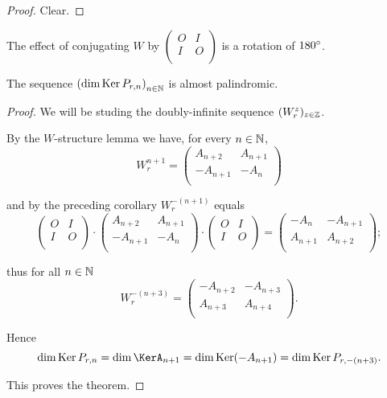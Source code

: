 \begin{proof}
  Clear.
\end{proof}

\begin{remark}
  The effect of conjugating $W$ by
  $\left(\begin{smallmatrix} O & I \\ I & O \\\end{smallmatrix}\right)$
  is a rotation of $180^{\circ}$.
\end{remark}

\begin{theorem}
  The sequence $\left(\dim\operatorname{Ker} P_{r,n}\right)_{n\in\mathbb{N}}$
  is almost palindromic.
\end{theorem}

\begin{proof}
  We will be studing the doubly-infinite sequence
  $(W_{r}^{z})_{z\in\mathbb{Z}}$.

  By the $W$-structure lemma we have, for every $n\in\mathbb{N}$,
  \[
  W_{r}^{n+1}
  =
  \left(
  \begin{array}{cc}
     A_{n+2} &  A_{n+1} \\
    -A_{n+1} & -A_{n}   \\
  \end{array}
  \right)
  \]

  and by the preceding corollary $W_{r}^{-(n+1)}$ equals
  \[
  \left(
  \begin{array}{cc}
    O & I \\
    I & O \\
  \end{array}
  \right)
  \cdot
  \left(
  \begin{array}{cc}
     A_{n+2} &  A_{n+1} \\
    -A_{n+1} & -A_{n}   \\
  \end{array}
  \right)
  \cdot
  \left(
  \begin{array}{cc}
    O & I \\
    I & O \\
  \end{array}
  \right)
  =
  \left(
  \begin{array}{cc}
    -A_{n}  & -A_{n+1} \\
     A_{n+1} & A_{n+2} \\
  \end{array}
  \right);
  \]

  thus for all $n\in\mathbb{N}$
  \[
  W_{r}^{-(n+3)}
  =
  \left(
  \begin{array}{cc}
    -A_{n+2}  & -A_{n+3} \\
     A_{n+3} & A_{n+4} \\
  \end{array}
  \right).
  \]

  Hence 
  \[
  \dim\Ker P_{r,n} =
  \dim\KerA_{n+1} =
  \dim\Ker(-A_{n+1}) =
  \dim\Ker P_{r,-(n+3)}.
  \]

  This proves the theorem.
\end{proof}
